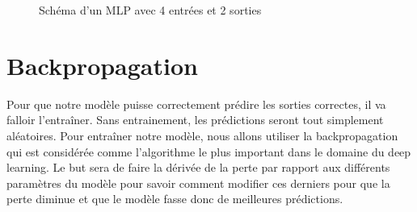 \documentclass{article}
\begin{document}
\begin{figure}[H]
\centering
{}
\caption{Schéma d'un MLP avec 4 entrées et 2 sorties}
\end{figure}

\section{Backpropagation}

Pour que notre modèle puisse correctement prédire les sorties correctes, il va falloir l'entraîner. Sans entrainement, les prédictions seront tout simplement aléatoires. Pour entraîner notre modèle, nous allons utiliser la backpropagation qui est considérée comme l'algorithme le plus important dans le domaine du deep learning. Le but sera de faire la dérivée de la perte par rapport aux différents paramètres du modèle pour savoir comment modifier ces derniers pour que la perte diminue et que le modèle fasse donc de meilleures prédictions.
\end{document}
